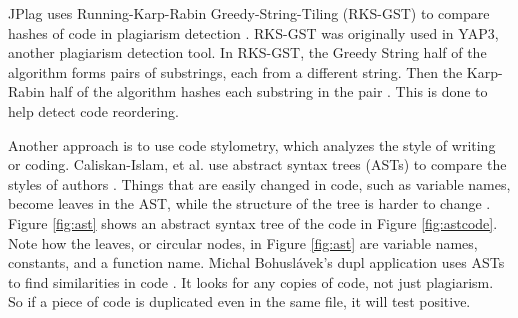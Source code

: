 \documentclass[12pt]{article}
\begin{document}
		JPlag uses Running-Karp-Rabin Greedy-String-Tiling (RKS-GST) to compare hashes of code in plagiarism detection \cite{prechelt+malpohl+philippsen}. RKS-GST was originally used in YAP3, another plagiarism detection tool. In RKS-GST, the Greedy String half of the algorithm forms pairs of substrings, each from a different string. Then the Karp-Rabin half of the algorithm hashes each substring in the pair \cite{wise}. This is done to help detect code reordering.
		
		Another approach is to use code stylometry, which analyzes the style of writing or coding. Caliskan-Islam, et al. use abstract syntax trees (ASTs) to compare the styles of authors \cite{caliskan-islam+harang+liu}. Things that are easily changed in code, such as variable names, become leaves in the AST, while the structure of the tree is harder to change \cite{caliskan-islam+harang+liu}. Figure \ref{fig:ast} shows an abstract syntax tree of the code in Figure \ref{fig:astcode}. Note how the leaves, or circular nodes, in Figure \ref{fig:ast} are variable names, constants, and a function name. Michal Bohuslávek's dupl application uses ASTs to find similarities in code \cite{bohuslave}. It looks for any copies of code, not just plagiarism. So if a piece of code is duplicated even in the same file, it will test positive.
		
\end{document}
